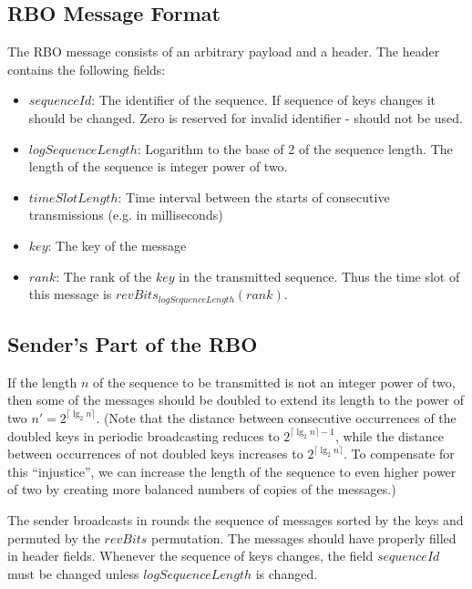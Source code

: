 \documentclass{llncs}
\begin{document}
\subsection{RBO Message Format}
The RBO message consists of an arbitrary payload and a header.
The header contains the following fields:
\begin{itemize}
    \item 
      $sequenceId$: The identifier of the sequence.
      If sequence of keys changes it should be changed. 
      Zero is reserved for invalid identifier - should not be used.
 
    \item
      $logSequenceLength$: Logarithm to the base of 2 of the sequence length. 
      The length of the sequence is integer power of two.
    \item
      $timeSlotLength$: 
      Time interval between the starts of consecutive transmissions (e.g. in milliseconds)
    \item
     $key$: The key of the message

    \item
      $rank$: The rank of the $key$ in the transmitted sequence. 
      Thus the time slot of this message is  $revBits_{logSequenceLength}(rank)$.
\end{itemize}

\subsection{Sender's Part of the RBO}
If the length $n$ of the sequence to be transmitted is not an integer power of two, then
some of the messages should be doubled to extend its length to the power of two $n'=2^{\lceil\lg_2 n\rceil}$.
(Note that the distance between consecutive occurrences of 
the doubled keys in periodic broadcasting reduces to $2^{\lceil\lg_2 n\rceil-1}$,
while the distance between occurrences of not doubled keys increases to $2^{\lceil\lg_2 n\rceil}$.
To compensate for this ``injustice'', we can increase the length of the sequence
to even higher power of two by creating  more balanced numbers of copies of the messages.)

The sender broadcasts in rounds the sequence of messages sorted by the keys and permuted by the 
$revBits$ permutation.
The messages should have properly filled in header fields.
Whenever the sequence of keys changes, the field $sequenceId$ must be changed unless
 $logSequenceLength$ is changed.
 
\end{document}
